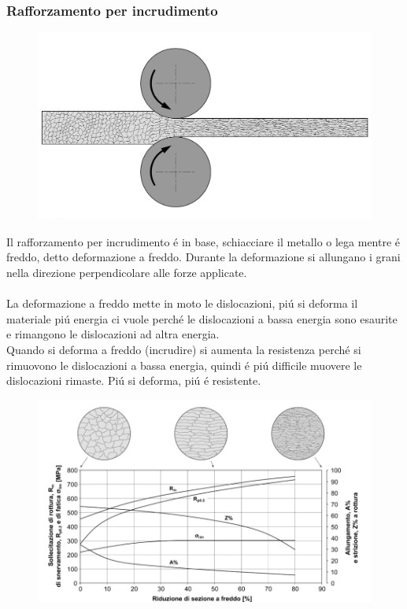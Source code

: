 \documentclass{article}
\begin{document}
            \subsubsection{Rafforzamento per incrudimento}
                \begin{figure}
                    \centering
                    \includegraphics[width=.80\linewidth]{Rafforzamento per Incrudimento.png}
                \end{figure}
                Il rafforzamento per incrudimento \'e in base, schiacciare il metallo o lega mentre \'e freddo, detto deformazione a freddo. Durante la deformazione si allungano i grani nella direzione perpendicolare alle forze applicate.\\ \\
                La deformazione a freddo mette in moto le dislocazioni, pi\'u si deforma il materiale pi\'u energia ci vuole perch\'e le dislocazioni a bassa energia sono esaurite e rimangono le dislocazioni ad altra energia.\\
                Quando si deforma a freddo (incrudire) si aumenta la resistenza perch\'e si rimuovono le dislocazioni a bassa energia, quindi \'e pi\'u difficile muovere le dislocazioni rimaste. Pi\'u si deforma, pi\'u \'e resistente.\\ \newpage
                \begin{figure}[ht]
                    \centering
                    \includegraphics[width=\linewidth]{Grafico di Cambio Sezione.png}
                \end{figure}
\end{document}
